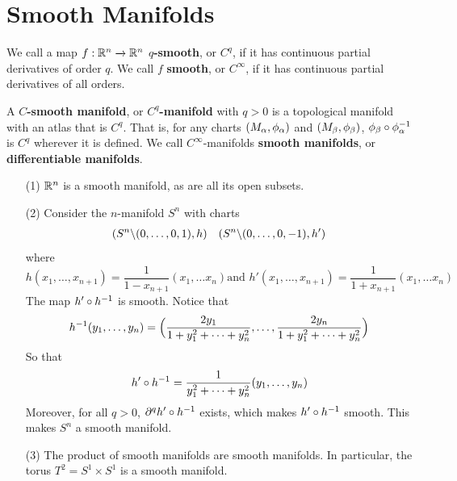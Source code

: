 \section{Smooth Manifolds}

\begin{definition}
    We call a map $f:\mathbb{R}^n \xrightarrow{} \mathbb{R}^n$ \textbf{$q$-smooth}, or $C^q$, if
    it has continuous partial derivatives of order  $q$. We call  $f$
    \textbf{smooth}, or $C^\infty$, if it has continuous partial derivatives of
    all orders.
\end{definition}

\begin{definition}
    A \textbf{$C$-smooth manifold}, or  \textbf{$C^q$-manifold} with $q>0$ is a
    topological manifold with an atlas that is  $C^q$. That is, for any charts
    $(M_\alpha,\phi_\alpha)$ and $(M_\beta,\phi_\beta)$, $\phi_\beta \circ \phi_\alpha^{-1}$ is $C^q$
    wherever it is defined. We call  $C^\infty$-manifolds  \textbf{smooth manifolds},
    or \textbf{differentiable manifolds}.
\end{definition}

\begin{example}\label{example_1.6}
    \begin{enumerate}
        \item[(1)] $\mathbb{R}^n$ is a smooth manifold, as are all its open subsets.

        \item[(2)] Consider the $n$-manifold  $S^n$ with charts
            \begin{align*}
                (S^n \backslash (0, \dots, 0,1),h) && (S^n \backslash (0, \dots, 0,-1),h')  \\
            \end{align*}
            where
            \begin{equation*}
                h(x_1, \dots,x_{n+1})=\frac{1}{1-x_{n+1}}(x_1, \dots x_n) \text{
                and } h'(x_1, \dots,x_{n+1})=\frac{1}{1+x_{n+1}}(x_1, \dots x_n)
            \end{equation*}
            The map $h' \circ h^{-1}$ is smooth. Notice that
            \begin{equation*}
                h^{-1}(y_1, \dots,y_n)=\Big{(}\frac{2y_1}{1+y_1^2+\dots+y_n^2},
                \dots, \frac{2y_n}{1+y_1^2+\dots+y_n^2}\Big{)}
            \end{equation*}
            So that
            \begin{equation*}
                h' \circ h^{-1}=\frac{1}{y_1^2+\dots+y_n^2}(y_1, \dots, y_n)
            \end{equation*}
            Moreover, for all $q>0$, $\partial^q{h' \circ h^{-1}}$ exists,
            which makes $h' \circ h^{-1}$ smooth. This makes $S^n$ a smooth
            manifold.

        \item[(3)] The product of smooth manifolds are smooth manifolds. In
            particular, the torus $T^2=S^1 \times S^1$ is a smooth manifold.
    \end{enumerate}
\end{example}

